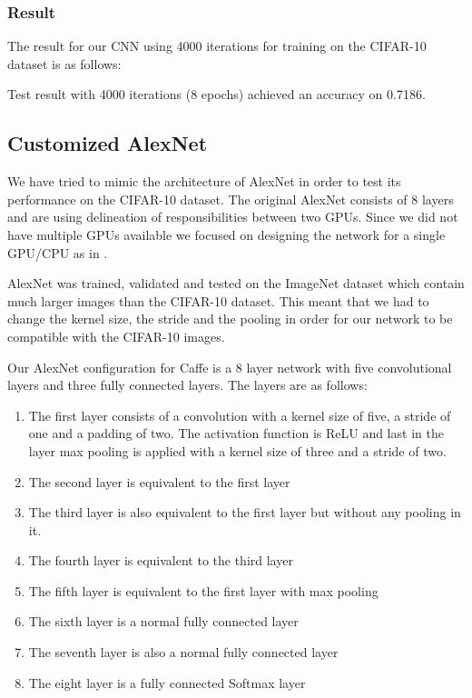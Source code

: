 \subsubsection{Result}

The result for our CNN using 4000 iterations for training on the CIFAR-10
dataset is as follows: 

Test result with 4000 iterations (8 epochs) achieved an accuracy on	0.7186.


\subsection{Customized AlexNet} %
\label{sub:alexNet}

We have tried to mimic the architecture of AlexNet\cite{AlexNet} in order
to test its performance on the CIFAR-10 dataset. The original AlexNet consists of 8
layers and are using delineation of responsibilities between two GPUs. Since we
did not have multiple GPUs available we focused on designing the network for a
single GPU/CPU as in \cite{ZeilerFergus}. 

AlexNet was trained, validated and tested on the ImageNet dataset which contain
much larger images than the CIFAR-10 dataset. This meant that we had to change
the kernel size, the stride and the pooling in order for our network to be
compatible with the CIFAR-10 images. 


Our AlexNet configuration for Caffe is a 8 layer network with five convolutional
layers and three fully connected layers. The layers are as follows:
\begin{enumerate}
	\item The first layer consists of a convolution with a kernel size of five, a
	stride of one and a padding of two. The activation function is ReLU and last in
	the layer max pooling is applied with a kernel size of three and a stride of
	two. 
	\item The second layer is equivalent to the first layer 
	\item The third layer is also equivalent to the first layer but without any
	pooling in it. 
	\item The fourth layer is equivalent to the third layer 
	\item The fifth layer is equivalent to the first layer with max pooling  
	\item The sixth layer is a normal fully connected layer
	\item The seventh layer is also a normal fully connected layer
	\item The eight layer is a fully connected Softmax layer
\end{enumerate}

